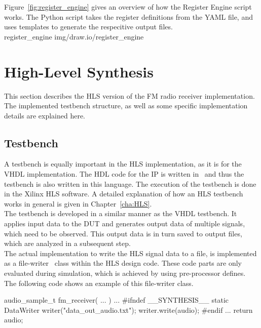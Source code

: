 Figure~\ref{fig:register_engine} gives an overview of how the Register Engine script works.
The Python script takes the register definitions from the YAML file, and uses templates to generate the respecitive output files.\\

 {register_engine} {img/draw.io/register_engine}


\section{High-Level Synthesis}

This section describes the HLS version of the FM radio receiver implementation.
The implemented testbench structure, as well as some specific implementation details are explained here.

\subsection{Testbench}
\label{sec:impl:hls:testbench}

A testbench is equally important in the HLS implementation, as it is for the VHDL implementation.
The HDL code for the IP is written in \cplusplus\ and thus the testbench is also written in this language.
The execution of the testbench is done in the Xilinx HLS software.
A detailed explanation of how an HLS testbench works in general is given in Chapter~\ref{cha:HLS}.\\

The testbench is developed in a similar manner as the VHDL testbench.
It applies input data to the DUT and generates output data of multiple signals, which need to be observed.
This output data is in turn saved to output files, which are analyzed in a subsequent step.\\

The actual implementation to write the HLS signal data to a file, is implemented as a file-writer \cplusplus\ class within the HLS design code.
These code parts are only evaluated during simulation, which is achieved by using pre-processor defines.
The following code shows an example of this file-writer class.\\

\begin{CppCode}
audio_sample_t fm_receiver( ... ) {
  ...
#ifndef __SYNTHESIS__
  static DataWriter writer("data_out_audio.txt");
  writer.write(audio);
#endif
  ...
  return audio;
}
\end{CppCode}


